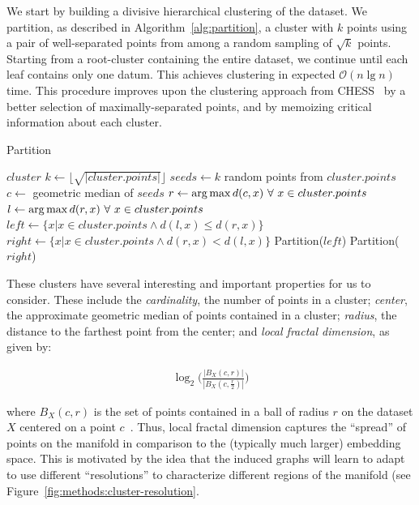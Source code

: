 We start by building a divisive hierarchical clustering of the dataset.
We partition, as described in Algorithm~\ref{alg:partition}, a cluster with $k$ points using a pair of well-separated points from among a random sampling of $\sqrt k$ points.
Starting from a root-cluster containing the entire dataset, we continue until each leaf contains only one datum.
This achieves clustering in expected $\mathcal{O}(n \lg n)$ time.
This procedure improves upon the clustering approach from CHESS~\cite{ishaq2019clustered} by a better selection of maximally-separated points, and by memoizing critical information about each cluster.

\begin{algorithm} %
\caption{Partition} %
\label{alg:partition} %
\begin{algorithmic}[1] %
    \REQUIRE $cluster$
    \STATE $k \leftarrow \lfloor \sqrt{|cluster.points|} \rfloor$
    \STATE $seeds \leftarrow k$ random points from $cluster.points$
    \STATE $c \leftarrow$ geometric median of $seeds$
    \STATE $r \leftarrow \operatorname*{arg\,max} d(c,x) \ \forall \ x \in cluster.points$
    \STATE $l \leftarrow \operatorname*{arg\,max} d(r,x) \ \forall \ x \in cluster.points$
    \STATE $left \leftarrow \{x | x \in cluster.points \land d(l,x) \le d(r,x)\}$
    \STATE $right \leftarrow \{x | x \in cluster.points \land d(r,x) < d(l,x)\}$
        \STATE Partition($left$)
    \ENDIF
        \STATE Partition($right$)
    \ENDIF
\end{algorithmic}
\end{algorithm}

These clusters have several interesting and important properties for us to consider.
These include the \textit{cardinality}, the number of points in a cluster;
\textit{center}, the approximate geometric median of points contained in a cluster;
\textit{radius}, the distance to the farthest point from the center;
and \textit{local fractal dimension},
as given by:

\begin{gather}
    \log_2\bigg(\frac{|B_X(c, r)|}{|B_X(c, \frac{r}{2})|}\bigg)
    \label{fractal-dimension}
\end{gather}

where $B_X(c,r)$ is the set of points contained in a ball of radius $r$ on the dataset $X$ centered on a point $c$~\cite{ishaq2019clustered}.
Thus, local fractal dimension captures the ``spread'' of points on the manifold in comparison to the (typically much larger) embedding space.
This is motivated by the idea that the induced graphs will learn to adapt to use different ``resolutions'' to characterize different regions of the manifold (see Figure~\ref{fig:methods:cluster-resolution}.




